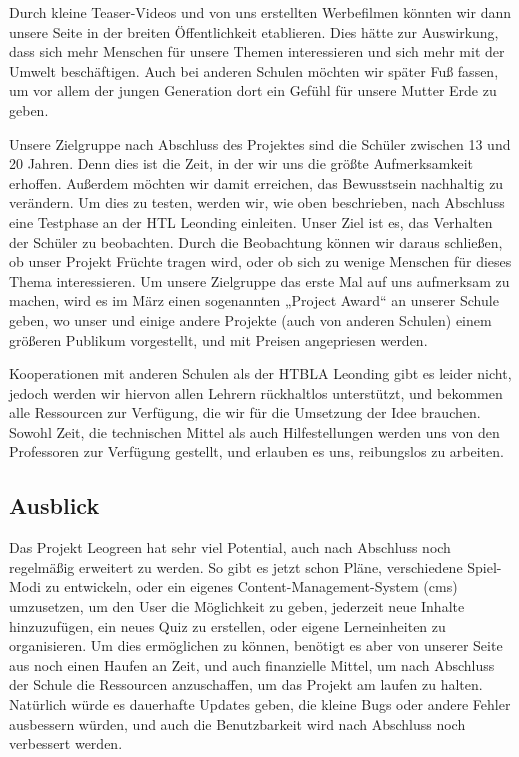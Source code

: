 Durch kleine Teaser-Videos und von uns erstellten Werbefilmen könnten wir dann unsere Seite in der breiten Öffentlichkeit etablieren. Dies hätte zur Auswirkung, dass sich mehr Menschen für unsere Themen interessieren und sich mehr mit der Umwelt beschäftigen. Auch bei anderen Schulen möchten wir später Fuß fassen, um vor allem der jungen Generation dort ein Gefühl für unsere Mutter Erde zu geben.  

Unsere Zielgruppe nach Abschluss des Projektes sind die Schüler zwischen 13 und 20 Jahren. Denn dies ist die Zeit, in der wir uns die größte Aufmerksamkeit erhoffen. Außerdem möchten wir damit erreichen, das Bewusstsein nachhaltig zu verändern. Um dies zu testen, werden wir, wie oben beschrieben, nach Abschluss eine Testphase an der HTL Leonding einleiten. Unser Ziel ist es, das Verhalten der Schüler zu beobachten.  Durch die Beobachtung können wir daraus schließen, ob unser Projekt Früchte tragen wird, oder ob sich zu wenige Menschen für dieses Thema interessieren. Um unsere Zielgruppe das erste Mal auf uns aufmerksam zu machen, wird es im März einen sogenannten „Project Award“ an unserer Schule geben, wo unser und einige andere Projekte (auch von anderen Schulen) einem größeren Publikum vorgestellt, und mit Preisen angepriesen werden.  

Kooperationen mit anderen Schulen als der HTBLA Leonding gibt es leider nicht, jedoch werden wir hiervon allen Lehrern rückhaltlos unterstützt, und bekommen alle Ressourcen zur Verfügung, die wir für die Umsetzung der Idee brauchen. Sowohl Zeit, die technischen Mittel als auch Hilfestellungen werden uns von den Professoren zur Verfügung gestellt, und erlauben es uns, reibungslos zu arbeiten.  

\subsection{Ausblick}

Das Projekt Leogreen hat sehr viel Potential, auch nach Abschluss noch regelmäßig erweitert zu werden. So gibt es jetzt schon Pläne, verschiedene Spiel-Modi zu entwickeln, oder ein eigenes Content-Management-System (cms) umzusetzen, um den User die Möglichkeit zu geben, jederzeit neue Inhalte hinzuzufügen, ein neues Quiz zu erstellen, oder eigene Lerneinheiten zu organisieren. Um dies ermöglichen zu können, benötigt es aber von unserer Seite aus noch einen Haufen an Zeit, und auch finanzielle Mittel, um nach Abschluss der Schule die Ressourcen anzuschaffen, um das Projekt am laufen zu halten. Natürlich würde es dauerhafte Updates geben, die kleine Bugs oder andere Fehler ausbessern würden, und auch die Benutzbarkeit wird nach Abschluss noch verbessert werden.  

